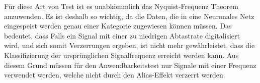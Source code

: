  
Für diese Art von Test ist es unabkömmlich das Nyquist-Frequenz Theorem anzuwenden.  Es ist deshalb so wichtig, da die Daten, die in eine Neuronales Netz eingespeist werden genau einer Kategorie zugewiesen können müssen. Das bedeutet, dass Falls ein Signal mit einer zu niedrigen Abtastrate digitalisiert wird, und sich somit Verzerrungen ergeben, ist nicht mehr gewährleistet, dass die Klassifizierung der ursprünglichen Signalfrequenz erreicht werden kann. Aus diesem Grund müssen für den Anwendbarkeitstest nur Signale mit einer Frequenz verwendet werden, welche nicht durch den Alias-Effekt verzerrt werden.

